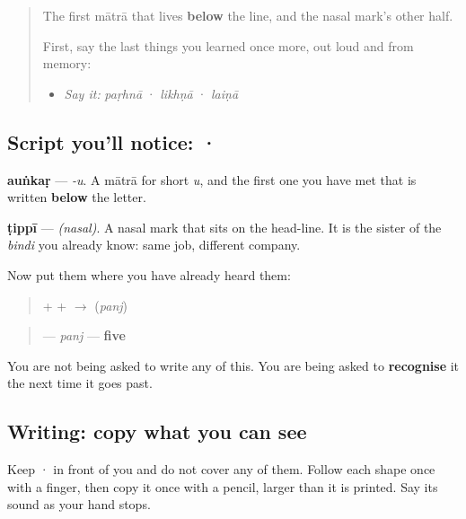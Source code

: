 \begin{quote}
The first mātrā that lives \textbf{below} the line, and the nasal mark's other half.

First, say the last things you learned once more, out loud and from memory:

\begin{itemize}
\raggedright
  \item \emph{Say it:} \emph{paṛhnā} · \emph{likhṇā} · \emph{laiṇā}
\end{itemize}
\end{quote}

\subsection*{Script you'll notice:  · }
\begin{quote}
\end{quote}

\textbf{auṅkaṛ} — \emph{-u}. A mātrā for short \emph{u}, and the first one you have met that is written \textbf{below} the letter.

\begin{quote}
\end{quote}

\textbf{ṭippī} — \emph{(nasal)}. A nasal mark that sits on the head-line. It is the sister of the \emph{bindi} you already know: same job, different company.

Now put them where you have already heard them:

\begin{quote}
\textbf{} + \textbf{} + \textbf{} $\to$ \textbf{} (\emph{panj})
\end{quote}

\begin{quote}
\textbf{} — \emph{panj} — \textbf{five}
\end{quote}

You are not being asked to write any of this. You are being asked to \textbf{recognise} it the next time it goes past.

\subsection*{Writing: copy what you can see}
Keep  ·  in front of you and do not cover any of them. Follow each shape once with a finger, then copy it once with a pencil, larger than it is printed. Say its sound as your hand stops.

